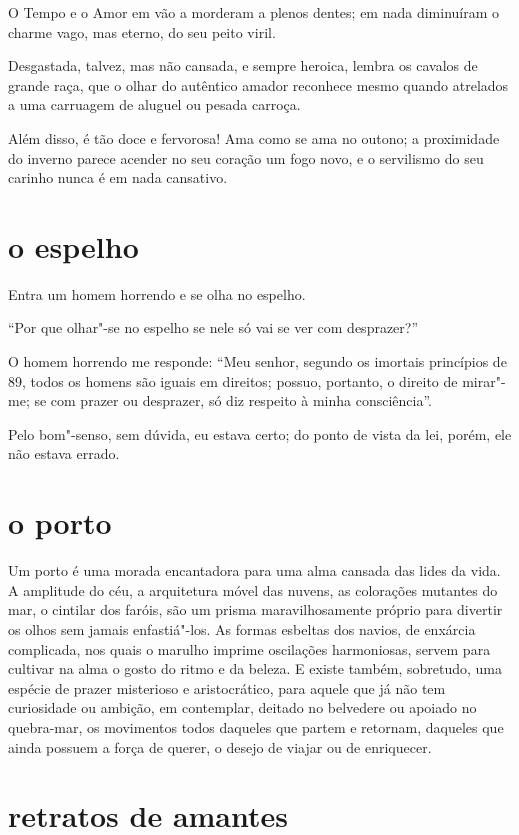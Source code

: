 O Tempo e o Amor em vão a morderam a plenos dentes; em nada
diminuíram o charme vago, mas eterno, do seu peito viril.

Desgastada, talvez, mas não cansada, e sempre heroica, lembra os cavalos
de grande raça, que o olhar do autêntico amador reconhece mesmo quando
atrelados a uma carruagem de aluguel ou pesada carroça.

Além disso, é tão doce e fervorosa! Ama como se ama no outono;
a proximidade do inverno parece acender no seu coração um
fogo novo, e o servilismo do seu carinho nunca é em nada cansativo.

\quebra\section[O espelho]{o espelho}

Entra um homem horrendo e se olha no espelho.

“Por que olhar"-se no espelho se nele só vai se
ver com desprazer?''

O homem horrendo me responde: “Meu senhor, segundo os imortais
princípios de 89, todos os homens são iguais em direitos; possuo,
portanto, o direito de mirar"-me; se com prazer ou desprazer, só diz
respeito à minha consciência''.

Pelo bom"-senso, sem dúvida, eu estava certo; do ponto de vista
da lei, porém, ele não estava errado.

\quebra\section[O porto]{o porto}

Um porto é uma morada encantadora para uma alma cansada das lides da
vida. A amplitude do céu, a arquitetura móvel das nuvens, as colorações
mutantes do mar, o cintilar dos faróis, são um prisma maravilhosamente
próprio para divertir os olhos sem jamais enfastiá"-los. As formas
esbeltas dos navios, de enxárcia complicada, nos quais o marulho
imprime oscilações harmoniosas, servem para cultivar na alma o gosto
do ritmo e da beleza. E existe também, sobretudo, uma espécie de prazer
misterioso e aristocrático, para aquele que já não tem curiosidade
ou ambição, em contemplar, deitado no belvedere ou apoiado no
quebra-mar, os movimentos todos daqueles que partem e 
retornam, daqueles que ainda possuem a força de querer, o desejo de
viajar ou de enriquecer.

\quebra\section[Retratos de amantes]{retratos de amantes}

